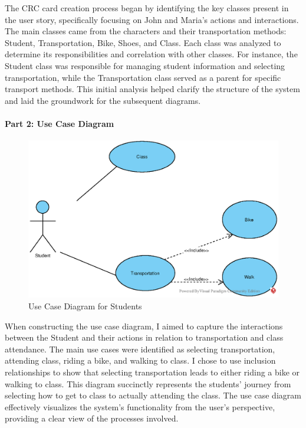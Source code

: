 The CRC card creation process began by identifying the key classes present in the user story, specifically focusing on John and Maria's actions and interactions. The main classes came from the characters and their transportation methods: Student, Transportation, Bike, Shoes, and Class. Each class was analyzed to determine its responsibilities and correlation with other classes. For instance, the Student class was responsible for managing student information and selecting transportation, while the Transportation class served as a parent for specific transport methods. This initial analysis helped clarify the structure of the system and laid the groundwork for the subsequent diagrams.

\vspace{1cm} %

\paragraph*{Part 2: Use Case Diagram}
\begin{figure}[H]
    \centering
    \includegraphics[width=\textwidth]{images/EPS/ex3-5_useCase.eps}
    \caption{Use Case Diagram for Students}
    \label{fig:ex3-5_useCase}
\end{figure}

When constructing the use case diagram, I aimed to capture the interactions between the Student and their actions in relation to transportation and class attendance. The main use cases were identified as selecting transportation, attending class, riding a bike, and walking to class. I chose to use inclusion relationships to show that selecting transportation leads to either riding a bike or walking to class. This diagram succinctly represents the students' journey from selecting how to get to class to actually attending the class. The use case diagram effectively visualizes the system's functionality from the user's perspective, providing a clear view of the processes involved.

